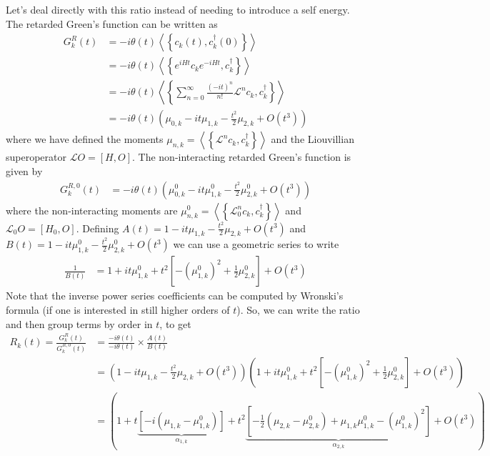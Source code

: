  Let's deal directly with this ratio instead of needing to introduce a self energy.
The retarded Green's function can be written as
\begin{align}
G_k^R(t)&=-i \theta(t)\left\langle\left\{c_k(t), c_k^{\dagger}(0)\right\}\right\rangle \\
&=-i \theta(t)\left\langle\left\{e^{i H t} c_k e^{-i H t}, c_k^{\dagger}\right\}\right\rangle \\
&=-i \theta(t)\left\langle\left\{\sum_{n=0}^{\infty} \frac{(-i t)^n}{n!} \mathcal{L}^n c_k, c_k^{\dagger}\right\}\right\rangle \\
&=-i \theta(t)\left( \mu_{0,k}-i t\mu_{1,k}-\frac{t^2}{2}\mu_{2,k}+O(t^3) \right)
\end{align}
where we have defined the moments $\mu_{n,k}=\left\langle\left\{\mathcal{L}^n c_k, c_k^{\dagger}\right\}\right\rangle$ and the Liouvillian superoperator $\mathcal{L} O=[H,O]$. The non-interacting retarded Green's function is given by
\begin{align}
G_k^{R,0}(t)&=-i \theta(t)\left( \mu_{0,k}^0-i t\mu_{1,k}^0-\frac{t^2}{2}\mu_{2,k}^0+O(t^3) \right)
\end{align}
where the non-interacting moments are $\mu_{n,k}^0=\left\langle\left\{\mathcal{L}_0^n c_k, c_k^{\dagger}\right\}\right\rangle$ and $\mathcal{L}_0 O=[H_0,O]$. Defining $A(t)= 1-i t\mu_{1,k}-\frac{t^2}{2}\mu_{2,k}+O(t^3)$ and $B(t)= 1-i t\mu_{1,k}^0-\frac{t^2}{2}\mu_{2,k}^0+O(t^3)$ we can use a geometric series to write
\begin{align}
\frac{1}{B(t)}&=1+i t \mu_{1, k}^0+t^2\left[-\left(\mu_{1, k}^0\right)^2+\frac{1}{2}\mu_{2, k}^0\right]+O\left(t^3\right)
\end{align}
Note that the inverse power series coefficients can be computed by Wronski's formula (if one is interested in still higher orders of $t$).
So, we can write the ratio and then group terms by order in $t$, to get
\begin{align}
R_k(t)=\frac{G_k^R(t)}{G_k^{R,0}(t)}
&=\frac{-i\theta (t)}{-i\theta (t)}\times\frac{A(t)}{B(t)} \\
&= \left( 1-i t\mu_{1,k}-\frac{t^2}{2}\mu_{2,k}+O(t^3) \right) \left( 1+i t \mu_{1, k}^0+t^2\left[-\left(\mu_{1, k}^0\right)^2+\frac{1}{2}\mu_{2, k}^0\right]+O\left(t^3\right) \right)\\
&= \left( 1+t\underbrace{\left[-i\left(\mu_{1,k}-\mu_{1,k}^0\right)\right]}_{\alpha _{1,k}}+t^2\underbrace{\left[-\frac{1}{2}\left(\mu_{2,k}-\mu_{2,k}^0\right)+\mu_{1,k}\mu_{1,k}^0-\left(\mu_{1,k}^0\right)^2\right]}_{\alpha _{2,k}}+O(t^3) \right)
\end{align}
